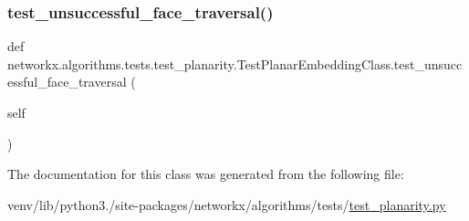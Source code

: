 \subsubsection{\texorpdfstring{test\+\_\+unsuccessful\+\_\+face\+\_\+traversal()}{test\_unsuccessful\_face\_traversal()}}
{\footnotesize\ttfamily def networkx.\+algorithms.\+tests.\+test\+\_\+planarity.\+Test\+Planar\+Embedding\+Class.\+test\+\_\+unsuccessful\+\_\+face\+\_\+traversal (\begin{DoxyParamCaption}\item[{}]{self }\end{DoxyParamCaption})}



The documentation for this class was generated from the following file\+:\begin{DoxyCompactItemize}
\item 
venv/lib/python3./site-\/packages/networkx/algorithms/tests/\hyperlink{test__planarity_8py}{test\+\_\+planarity.\+py}\end{DoxyCompactItemize}
